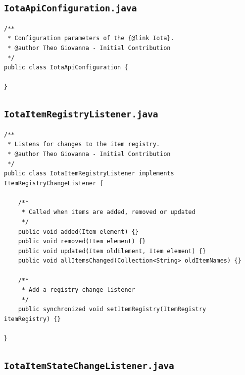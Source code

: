 \documentclass[a4paper,10pt]{article}
\begin{document}
\subsection{\texttt{IotaApiConfiguration.java}}

\begin{verbatim}
/**
 * Configuration parameters of the {@link Iota}.
 * @author Theo Giovanna - Initial Contribution
 */
public class IotaApiConfiguration {

}
\end{verbatim}

\subsection{\texttt{IotaItemRegistryListener.java}}

\begin{verbatim}
/**
 * Listens for changes to the item registry.
 * @author Theo Giovanna - Initial Contribution
 */
public class IotaItemRegistryListener implements ItemRegistryChangeListener {

	/**
	 * Called when items are added, removed or updated
	 */ 
	public void added(Item element) {}
	public void removed(Item element) {}
	public void updated(Item oldElement, Item element) {}
	public void allItemsChanged(Collection<String> oldItemNames) {}

	/**
	 * Add a registry change listener
	 */
	public synchronized void setItemRegistry(ItemRegistry itemRegistry) {}

}
\end{verbatim}

\newpage

\subsection{\texttt{IotaItemStateChangeListener.java}}
\end{document}
